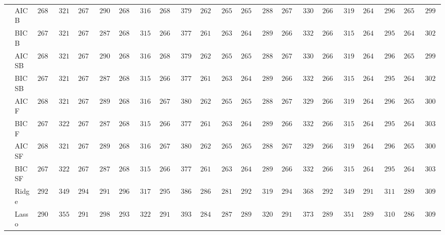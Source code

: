 \begin{tabular}{p{0.2cm}p{1cm}|p{0.6cm}p{0.6cm}|p{0.6cm}p{0.6cm}p{0.6cm}p{0.6cm}p{0.6cm}p{0.6cm}|p{0.6cm}p{0.6cm}p{0.6cm}p{0.6cm}p{0.6cm}p{0.6cm}|p{0.6cm}p{0.6cm}p{0.6cm}p{0.6cm}p{0.6cm}p{0.6cm}}
 & AIC B  & $2680.84$ & $321.36$ & $2676.94$ & $290.66$ & $2689.45$ & $316.70$ & $2680.40$ & $379.80$ & $2623.09$ & $265.06$ & $2652.12$ & $288.61$ & $2674.36$ & $330.21$ & $2668.99$ & $319.28$ & $2649.50$ & $296.26$ & $2651.86$ & $299.83$ \\
 & BIC B  & $2673.93$ & $321.96$ & $2672.07$ & $287.70$ & $2683.69$ & $315.27$ & $2669.74$ & $377.79$ & $2614.05$ & $263.04$ & $2644.55$ & $289.57$ & $2668.42$ & $332.51$ & $2662.65$ & $315.24$ & $2640.90$ & $295.29$ & $2646.33$ & $302.84$ \\
 & AIC SB  & $2680.84$ & $321.36$ & $2676.94$ & $290.66$ & $2689.45$ & $316.70$ & $2680.40$ & $379.80$ & $2623.09$ & $265.06$ & $2652.12$ & $288.61$ & $2674.36$ & $330.21$ & $2668.99$ & $319.28$ & $2649.50$ & $296.26$ & $2651.86$ & $299.83$ \\
 & BIC SB  & $2673.93$ & $321.96$ & $2672.07$ & $287.70$ & $2683.69$ & $315.27$ & $2669.74$ & $377.79$ & $2614.05$ & $263.04$ & $2644.55$ & $289.57$ & $2668.42$ & $332.51$ & $2662.65$ & $315.24$ & $2640.90$ & $295.29$ & $2646.33$ & $302.84$ \\
 & AIC F  & $2680.75$ & $321.34$ & $2676.10$ & $289.96$ & $2688.15$ & $316.80$ & $2677.23$ & $380.46$ & $2623.04$ & $265.04$ & $2651.29$ & $288.27$ & $2671.46$ & $329.52$ & $2668.55$ & $319.03$ & $2648.43$ & $296.54$ & $2650.86$ & $300.73$ \\
 & BIC F  & $2673.34$ & $322.12$ & $2672.07$ & $287.70$ & $2683.29$ & $315.45$ & $2669.74$ & $377.79$ & $2613.70$ & $263.20$ & $2644.30$ & $289.69$ & $2667.58$ & $332.92$ & $2662.65$ & $315.24$ & $2640.48$ & $295.07$ & $2646.63$ & $303.15$ \\
 & AIC SF  & $2680.75$ & $321.34$ & $2676.10$ & $289.96$ & $2688.15$ & $316.80$ & $2677.23$ & $380.46$ & $2623.04$ & $265.04$ & $2651.29$ & $288.27$ & $2671.47$ & $329.52$ & $2668.55$ & $319.03$ & $2648.43$ & $296.54$ & $2650.86$ & $300.73$ \\
 & BIC SF  & $2673.34$ & $322.12$ & $2672.07$ & $287.70$ & $2683.29$ & $315.45$ & $2669.74$ & $377.79$ & $2613.70$ & $263.20$ & $2644.30$ & $289.69$ & $2667.62$ & $332.91$ & $2662.65$ & $315.24$ & $2640.48$ & $295.07$ & $2646.63$ & $303.15$ \\
 & Ridge  & $2929.29$ & $349.67$ & $2942.89$ & $291.69$ & $2967.01$ & $317.15$ & $2952.16$ & $386.78$ & $2864.22$ & $281.97$ & $2929.88$ & $319.63$ & $2945.32$ & $368.81$ & $2920.99$ & $349.24$ & $2913.64$ & $311.21$ & $2891.17$ & $309.37$ \\
 & Lasso  & $2909.34$ & $355.91$ & $2919.02$ & $298.62$ & $2930.73$ & $322.98$ & $2916.61$ & $393.04$ & $2840.92$ & $287.29$ & $2895.79$ & $320.95$ & $2913.09$ & $373.81$ & $2899.60$ & $351.35$ & $2890.65$ & $310.92$ & $2869.77$ & $309.43$ \\

\end{tabular}
